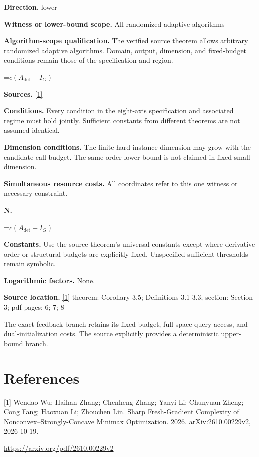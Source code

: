 \documentclass[10pt,a4paper]{article}
\newcommand{\AtlasMath}[1]{\par\begingroup\centering\setbox0=\hbox{$\displaystyle #1$}\ifdim\wd0>1.4\linewidth\typeout{ATLAS WIDE FORMULA: \the\wd0}\fi\ifdim\wd0>\linewidth\resizebox{\linewidth}{!}{\box0}\else\box0\fi\par\endgroup}
\begin{document}
\textbf{Direction.} lower

\textbf{Witness or lower-bound scope.} All randomized adaptive algorithms

\textbf{Algorithm-scope qualification.} The verified source theorem allows arbitrary randomized adaptive algorithms. Domain, output, dimension, and fixed-budget conditions remain those of the specification and region.

\AtlasMath{c(A_{\mathrm{det}}+I_G)}
\textbf{Sources.} \href{https://arxiv.org/pdf/2610.00229v2}{[1]}

\textbf{Conditions.} Every condition in the eight-axis specification and associated regime must hold jointly. Sufficient constants from different theorems are not assumed identical.

\textbf{Dimension conditions.} The finite hard-instance dimension may grow with the candidate call budget. The same-order lower bound is not claimed in fixed small dimension.

\textbf{Simultaneous resource costs.} All coordinates refer to this one witness or necessary constraint.

\textbf{N.}

\AtlasMath{c(A_{\mathrm{det}}+I_G)}
\textbf{Constants.} Use the source theorem’s universal constants except where derivative order or structural budgets are explicitly fixed. Unspecified sufficient thresholds remain symbolic.

\textbf{Logarithmic factors.} None.

\textbf{Source location.} \href{https://arxiv.org/pdf/2610.00229v2}{[1]} theorem: Corollary 3.5; Definitions 3.1-3.3; section: Section 3; pdf pages: 6; 7; 8

The exact-feedback branch retains its fixed budget, full-space query access, and dual-initialization costs. The source explicitly provides a deterministic upper-bound branch.

\section{References}
[1] Wendao Wu; Haihan Zhang; Chenheng Zhang; Yanyi Li; Chunyuan Zheng; Cong Fang; Haoxuan Li; Zhouchen Lin. Sharp Fresh-Gradient Complexity of Nonconvex--Strongly-Concave Minimax Optimization. 2026. arXiv:2610.00229v2, 2026-10-19.

\url{https://arxiv.org/pdf/2610.00229v2}
\end{document}

